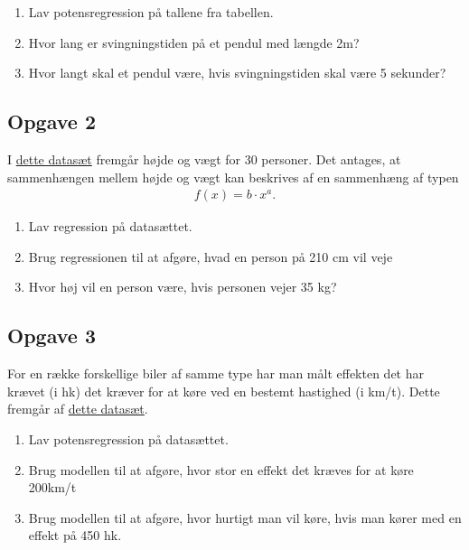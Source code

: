\begin{enumerate}[label=\roman*)]
	\item Lav potensregression på tallene fra tabellen. 
	\item Hvor lang er svingningstiden på et pendul med længde 2m?
	\item Hvor langt skal et pendul være, hvis svingningstiden skal være 5 sekunder?
\end{enumerate}


\subsection*{Opgave 2}
I \href{https://github.com/ChristianJLex/TeachingNotes/raw/master/2023-2024/Data%20og%20lign/H%C3%B8jdeV%C3%A6gt.xlsx}{\color{blue!60} dette datasæt} fremgår højde og vægt for 30 personer. Det antages, at sammenhængen mellem højde og vægt kan beskrives af en sammenhæng af typen
\begin{align*}
	f(x) = b \cdot x^a.
\end{align*}

\begin{enumerate}[label=\roman*)]
	\item Lav regression på datasættet.
	\item Brug regressionen til at afgøre, hvad en person på 210 cm vil veje
	\item Hvor høj vil en person være, hvis personen vejer 35 kg?
\end{enumerate}

\subsection*{Opgave 3}
For en række forskellige biler af samme type har man målt effekten det har krævet (i hk) det kræver for at køre ved en bestemt hastighed (i km/t). Dette fremgår af \href{https://github.com/ChristianJLex/TeachingNotes/raw/master/2023-2024/Data og lign/hk.xlsx}{\color{blue!60} dette datasæt}.

\begin{enumerate}[label=\roman*)]
	\item Lav potensregression på datasættet.
	\item Brug modellen til at afgøre, hvor stor en effekt det kræves for at køre 200km/t
	\item Brug modellen til at afgøre, hvor hurtigt man vil køre, hvis man kører med en effekt 
	på 450 hk.
\end{enumerate}

